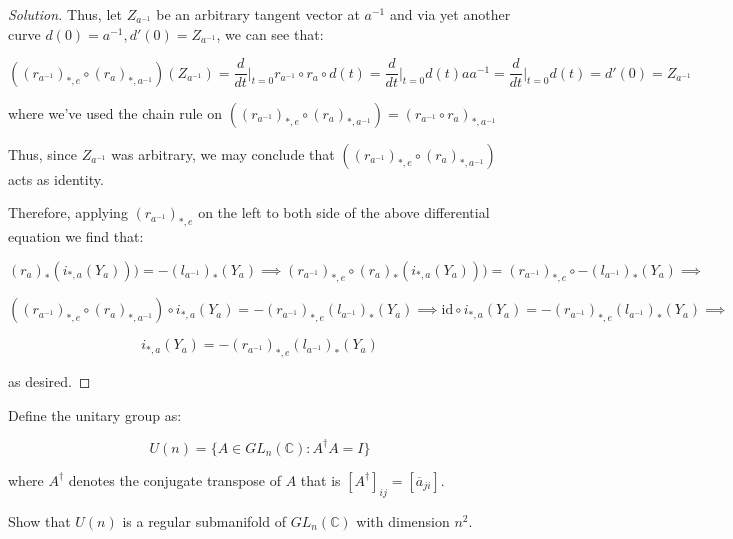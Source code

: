 \documentclass[10pt]{article}
\newenvironment{problem}[2][]{\begin{trivlist}
\item[\hskip \labelsep {\bfseries #1}\hskip \labelsep {\bfseries #2.}]}{\end{trivlist}}
\begin{document}
\begin{proof}[Solution]
Thus, let $Z_{a^{-1}}$ be an arbitrary tangent vector at $a^{-1}$ and via yet another curve $d(0) = a^{-1}, d'(0) = Z_{a^{-1}}$, we can see that:

$$((r_{a^{-1}})_{*, e} \circ (r_a)_{*, a^{-1}}) ( Z_{a^{-1}}) = \frac{d}{dt} \bigg|_{t=0} r_{a^{-1}} \circ r_{a} \circ d(t) =  \frac{d}{dt} \bigg|_{t=0} d(t) a a^{-1} =  \frac{d}{dt} \bigg|_{t=0} d(t) = d'(0) = Z_{a^{-1}} $$

where we've used the chain rule on $((r_{a^{-1}})_{*, e} \circ (r_a)_{*, a^{-1}})  = (r_{a^{-1}} \circ r_a)_{*, a^{-1}}$ 

Thus, since $Z_{a^{-1}}$ was arbitrary, we may conclude that $((r_{a^{-1}})_{*, e} \circ (r_a)_{*, a^{-1}})$ acts as identity.

Therefore, applying $(r_{a^{-1}})_{*, e}$ on the left to both side of the above differential equation we find that:

$$  (r_a)_*( i_{*, a}(Y_a)) ) = -(l_{a^{-1}})_*(Y_a) \implies (r_{a^{-1}})_{*, e}\circ  (r_a)_*( i_{*, a}(Y_a)) ) = (r_{a^{-1}})_{*, e}\circ -(l_{a^{-1}})_*(Y_a) \implies $$

$$ ( (r_{a^{-1}})_{*, e}\circ  (r_a)_{*, a^{-1}}) \circ i_{*, a}(Y_a) = - (r_{a^{-1}})_{*, e}(l_{a^{-1}})_*(Y_a) \implies \text{id}  \circ i_{*, a}(Y_a) = - (r_{a^{-1}})_{*, e}(l_{a^{-1}})_*(Y_a) \implies$$

$$  i_{*, a}(Y_a) = - (r_{a^{-1}})_{*, e}(l_{a^{-1}})_*(Y_a) $$

as desired.
\end{proof}

\begin{problem}{Question 4}

Define the unitary group as:

$$U(n) = \{ A \in GL_n(\mathbb{C}) : A^\dag A = I \}$$

where $A^\dag$ denotes the conjugate transpose of $A$ that is $[A^\dag]_{ij} = [\overline{a}_{ji} ]$.

Show that $U(n)$ is a regular submanifold of $GL_n(\mathbb{C})$ with dimension $n^2$.


\end{problem}
\end{document}
